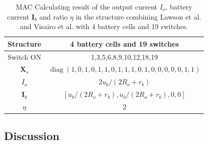 \documentclass{article}
\DeclareMathOperator{\diag}{diag}
\begin{document}
\begin{table}[htbp]
  \centering
    \caption{MAC Calculating result of the output current $I_o$, battery current $\bm{I}_b$ and ratio $\eta$ in the structure combining Lawson et al.\cite{lawsonSoftwareConfigurableBattery2012} and Visairo et al.\cite{visairoReconfigurableBatteryPack2008} with 4 battery cells and 19 switches.}
    \begin{tabular}{cc}
    \toprule
        Structure & 4 battery cells and 19 switches  \\
    \midrule
    Switch ON & 1,3,5,6,8,9,10,12,18,19 \\
    $\bm{X}_s$ & $\diag(1,0,1,0,1,1,0,1,1,1,0,1,0,0,0,0,0,1,1)$ \\
    \midrule
        $I_o$ & $2u_b/(2R_o+r_b)$ \\
        $\bm{I}_b$ & $[u_b/(2R_o+r_b),u_b/(2R_o+r_b),0,0]$ \\
        $\eta$     & 2 \\
    \bottomrule
    \end{tabular}%
  \label{tab:find_mac}%
\end{table}%

\subsection{Discussion}
\end{document}
